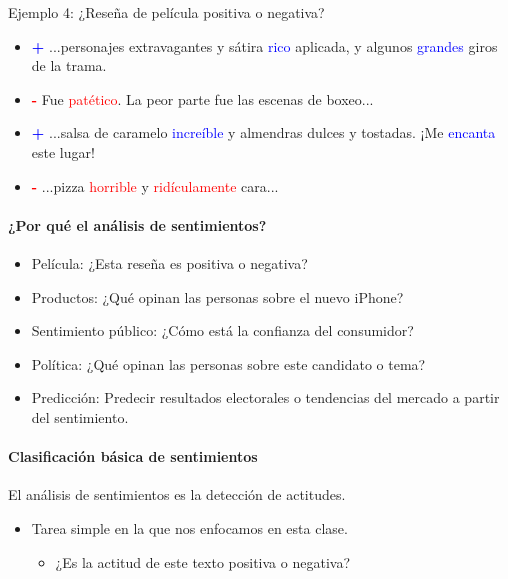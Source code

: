 Ejemplo 4: ¿Reseña de película positiva o negativa?

\begin{itemize}
    \item \textcolor{blue}{\textbf{+}} ...personajes extravagantes y sátira \textcolor{blue}{rico} aplicada, y algunos \textcolor{blue}{grandes} giros de la trama.
    \item \textcolor{red}{\textbf{-}} Fue \textcolor{red}{patético}. La peor parte fue las escenas de boxeo...
    \item \textcolor{blue}{\textbf{+}} ...salsa de caramelo \textcolor{blue}{increíble} y almendras dulces y tostadas. ¡Me \textcolor{blue}{encanta} este lugar!
    \item \textcolor{red}{\textbf{-}} ...pizza \textcolor{red}{horrible} y \textcolor{red}{ridículamente} cara...
\end{itemize}



\paragraph{¿Por qué el análisis de sentimientos?}

\begin{itemize}
    \item Película: ¿Esta reseña es positiva o negativa?
    \item Productos: ¿Qué opinan las personas sobre el nuevo iPhone?
    \item Sentimiento público: ¿Cómo está la confianza del consumidor?
    \item Política: ¿Qué opinan las personas sobre este candidato o tema?
    \item Predicción: Predecir resultados electorales o tendencias del mercado a partir del sentimiento.
\end{itemize}


\paragraph{Clasificación básica de sentimientos}

El análisis de sentimientos es la detección de actitudes.

\begin{itemize}
    \item Tarea simple en la que nos enfocamos en esta clase.
    \begin{itemize}
        \item ¿Es la actitud de este texto positiva o negativa?
    \end{itemize}
\end{itemize}



